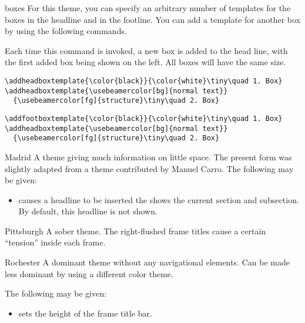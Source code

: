 \begin{themeexample}[{\opt{|[headheight=|\meta{head height}|,footheight=|\meta{foot height}|]|}}]{boxes}
  For this theme, you can specify an arbitrary number of templates for
  the boxes in the headline and in the footline. You can add a
  template for another box by using the following commands.
\end{themeexample}

\begin{command}{\addheadboxtemplate%
    }
  Each time this command is invoked, a new box is added to the head
  line, with the first added box being shown on the left. All boxes
  will have the same size.
  \example
\begin{verbatim}
\addheadboxtemplate{\color{black}}{\color{white}\tiny\quad 1. Box}
\addheadboxtemplate{\usebeamercolor[bg]{normal text}}
  {\usebeamercolor[fg]{structure}\tiny\quad 2. Box}
\end{verbatim}
\end{command}

\begin{command}{\addfootboxtemplate%
    }
  \example
\begin{verbatim}
\addfootboxtemplate{\color{black}}{\color{white}\tiny\quad 1. Box}
\addheadboxtemplate{\usebeamercolor[bg]{normal text}}
  {\usebeamercolor[fg]{structure}\tiny\quad 2. Box}
\end{verbatim}
\end{command}


\begin{themeexample}{Madrid}
  A theme giving much information on little space. The present form
  was slightly adapted from a theme contributed by Manuel Carro.
  The following  may be given:
  \begin{itemize}
  \item {} causes a headline to be inserted the
    shows the current section and subsection. By default, this
    headline is not shown.
  \end{itemize}
\end{themeexample}


\begin{themeexample}{Pittsburgh}
  A sober theme. The right-flushed frame titles cause a certain
  ``tension'' inside each frame.
\end{themeexample}


\begin{themeexample}{Rochester}
  A dominant theme without any navigational elements. Can be made less
  dominant by using a different color theme.

  The following  may be given:
  \begin{itemize}
  \item {} sets the height of the
    frame title bar.
  \end{itemize}
\end{themeexample}




